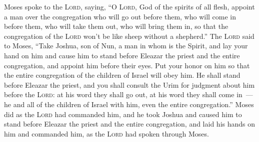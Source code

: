 \begin{inparaenum}
     Moses spoke to the \textsc{Lord}, saying,%
     ``O \textsc{Lord}, God of the spirits of all flesh, appoint a man over the congregation%
     who will go out before them, who will come in before them, who will take them out, who will bring them in, so that the congregation of the \textsc{Lord} won't be like sheep without a shepherd.''%
     The \textsc{Lord} said to Moses, ``Take Joshua, son of Nun, a man in whom is the Spirit, and lay your hand on him%
     and cause him to stand before Eleazar the priest and the entire congregation, and appoint him before their eyes.%
     Put your honor on him so that the entire congregation of the children of Israel will obey him.%
     He shall stand before Eleazar the priest, and you shall consult the Urim for judgment about him before the \textsc{Lord}: at his word they shall go out, at his word they shall come in~--- he and all of the children of Israel with him, even the entire congregation.''%
     Moses did as the \textsc{Lord} had commanded him, and he took Joshua and caused him to stand before Eleazar the priest and the entire congregation,%
     and laid his hands on him and commanded him, as the \textsc{Lord} had spoken through Moses.%
\end{inparaenum}

